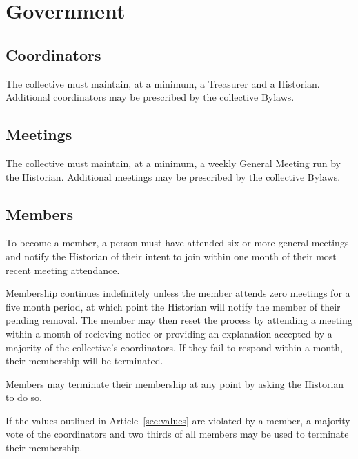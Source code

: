 \chapter{Government}

\section{Coordinators}\label{sec:coordinators}
The collective must maintain, at a minimum, a Treasurer and a Historian. Additional coordinators may be prescribed by the collective Bylaws.

\section{Meetings}\label{sec:meetings}
The collective must maintain, at a minimum, a weekly General Meeting run by the Historian. Additional meetings may be prescribed by the collective Bylaws.

\section{Members}\label{sec:members}
To become a member, a person must have attended six or more general meetings and notify the Historian of their intent to join within one month of their most recent meeting attendance.

Membership continues indefinitely unless the member attends zero meetings for a five month period, at which point the Historian will notify the member of their pending removal. The member may then reset the process by attending a meeting within a month of recieving notice or providing an explanation accepted by a majority of the collective's coordinators. If they fail to respond within a month, their membership will be terminated.

Members may terminate their membership at any point by asking the Historian to do so.

If the values outlined in Article~\ref{sec:values} are violated by a member, a majority vote of the coordinators and two thirds of all members may be used to terminate their membership.
